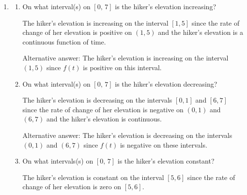 \documentclass{article}
\begin{document}
\begin{enumerate}
    
    \begin{enumerate}

    \item
    \begin{enumerate}
        \item 
        \begin{problem}
        On what interval(s) on $[0,\,7]$ is the hiker's elevation increasing?
        \end{problem}
        \pspace{0.5in}

        \begin{solution}
            The hiker's elevation is increasing on the interval $[1, 5]$ since the rate of change of her elevation is positive on $(1, 5)$ and the hiker's elevation is a continuous function of time.

            Alternative answer: The hiker's elevation is increasing on the interval $(1, 5)$ since $f(t)$ is positive on this interval.
        \end{solution}

        
        \item 
        \begin{problem}
        On what interval(s) on $[0,\,7]$ is the hiker's elevation decreasing?
        \end{problem}
        \pspace{0.5in}

        \begin{solution}
            The hiker's elevation is decreasing on the intervals $[0, 1]$ and $[6, 7]$ since the rate of change of her elevation is negative on $(0, 1)$ and $(6, 7)$ and the hiker's elevation is continuous.

            Alternative answer: The hiker's elevation is decreasing on the intervals $(0, 1)$ and $(6, 7)$ since $f(t)$ is negative on these intervals.
        \end{solution}

        \item 
        \begin{problem}
        On what intervals(s) on $[0,\,7]$ is the hiker's elevation constant?
        \end{problem}
        \pspace{0.5in}

        \begin{solution}
            The hiker's elevation is constant on the interval $[5, 6]$ since the rate of change of her elevation is zero on $[5, 6]$.
        \end{solution}


\end{enumerate}
\end{enumerate}
\end{enumerate}
\end{document}
